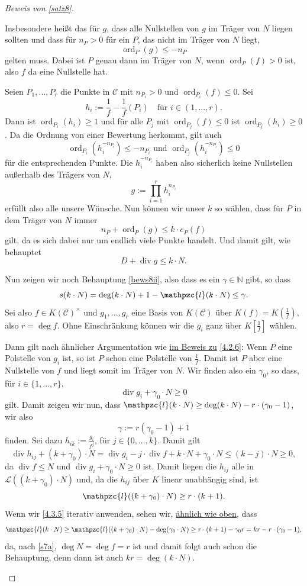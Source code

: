 \documentclass[a4paper,12pt,index=toc]{scrbook}
\theoremstyle{keinenummern} %
\def\CC{\mathcal{C}}
\renewcommand{\L}{\mathcal{L}}
\def\ll{\mathpzc{l}}
\renewcommand{\div}{\operatorname{div}}
\newcommand{\ord}{\operatorname{ord}}
\renewcommand{\dotsc}{\ensuremath{\!...}}
\newcommand{\set}[1]{\ensuremath{\mathbb{#1}}}
\newcommand{\N}{\set{N}}
\begin{document}
\begin{proof}[Beweis von \cref{satz8}]
\begin{enumerate}
Insbesondere heißt das für $g$, dass alle Nullstellen von $g$ im Träger von $N$ liegen sollten und dass für $n_{P}>0$ für ein $P$, das nicht im Träger von $N$ liegt, \[\ord_{P}(g)\leq-n_{P}\] gelten muss. Dabei ist $P$ genau dann im Träger von $N$, wenn $\ord_{P}(f)>0$ ist, also $f$ da eine Nullstelle hat.

Seien $P_{1},\dotsc,P_{r}$ die Punkte in $\CC$ mit $n_{P_{i}}>0$ und $\ord_{P_{i}}(f)\leq 0$. Sei
\[h_{i}:=\frac{1}{f}-\frac{1}{f}(P_{i})\quad\text{für }i\in(1,\dotsc,r).\]
Dann ist $\ord_{P_{i}}(h_{i})\geq 1$ und für alle $P_{j}$ mit $\ord_{P_{j}}(f)\leq 0$ ist $\ord_{P_{j}}(h_{i})\geq 0$. Da die Ordnung von einer Bewertung herkommt, gilt auch
\[\ord_{P_{i}}(h_{i}^{-n_{P_{i}}})\leq-n_{P_{i}}\text{ und }\ord_{P_{j}}(h_{i}^{-n_{P_{i}}})\leq 0\]
für die entsprechenden Punkte. Die $h_{i}^{-n_{P_{i}}}$ haben also sicherlich keine Nullstellen außerhalb des Trägers von $N$,
\[g:=\prod_{i=1}^{r}h_{i}^{n_{P_{i}}}\]
erfüllt also alle unsere Wünsche. Nun können wir unser $k$ so wählen, dass für $P$ in dem Träger von $N$ immer 
\[n_{P}+\ord_{P}(g)\leq k\cdot e_{P}(f)\]
gilt, da es sich dabei nur um endlich viele Punkte handelt. Und damit gilt, wie behauptet
\[D+\div g\leq k\cdot N.\]

Nun zeigen wir noch Behauptung \ref{bews8ii}, also dass es ein $\gamma\in\N$ gibt, so dass
\[s(k\cdot N)=\deg(k\cdot N)+1-\ll(k\cdot N)\leq\gamma.\]
Sei also $f\in K(\CC)^{\times}$ und $g_{1},\dotsc,g_{r}$ eine Basis von $K(\CC)$ über $K(f)=K(\frac{1}{f})$, also $r=\deg f$. Ohne Einschränkung können wir die $g_{i}$ ganz über $K[\frac{1}{f}]$ wählen.

Dann gilt nach ähnlicher Argumentation wie \hyperlink{ganzpolstelle}{im Beweis zu} \cref{4.2.6}: Wenn $P$ eine Polstelle von $g_{i}$ ist, so ist $P$ schon eine Polstelle von $\frac{1}{f}$. Damit ist $P$ aber eine Nullstelle von $f$ und liegt somit im Träger von $N$. Wir finden also ein $\gamma_{0}$, so dass, für $i\in\{1,\dotsc,r\}$,
\[\div g_{i}+\gamma_{0}\cdot N\geq 0\]
gilt. Damit zeigen wir nun, dass $\ll(k\cdot N)\geq \deg(k\cdot N)-r\cdot(\gamma_{0}-1)$, wir also \[\gamma:=r(\gamma_{0}-1)+1\] 
finden. Sei dazu $h_{ik}:=\frac{g_{i}}{f^{j}}$, für $j\in\{0,\dotsc,k\}$. Damit gilt
\[\div h_{ij} + (k+\gamma_{0})\cdot N=\div g_{i}-j\cdot \div f +k\cdot N +\gamma_{0}\cdot N\leq (k-j)\cdot N\geq 0,\]
da $\div f\leq N$ und $\div g_{i}+\gamma_{0}\cdot N\geq 0$ ist. Damit liegen die $h_{ij}$ alle in $\L((k+\gamma_{0})\cdot N)$ und, da die $h_{ij}$ über $K$ linear unabhängig sind, ist
\[\ll((k+\gamma_{0})\cdot N)\geq r\cdot (k+1).\]
Wenn wir \cref{4.3.5} iterativ anwenden, sehen wir, \hyperlink{bews8e3}{ähnlich wie oben}, dass
\[\ll(k\cdot N)\geq\ll((k+\gamma_{0})\cdot N)-\deg(\gamma_{0}\cdot N)\geq r\cdot (k+1)-\gamma_{0}r=kr-r\cdot(\gamma_{0}-1),\]
da, nach \cref{s7a}, $\deg N=\deg f=r$ ist und damit folgt auch schon die Behauptung, denn dann ist auch $kr=\deg(k\cdot N)$.
\end{enumerate}
\end{proof}
\end{document}
